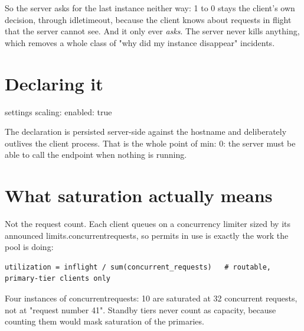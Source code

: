 \documentclass[11pt,a4paper,oneside]{book}
\newcommand{\aperiobreakableunderscore}{\textunderscore\allowbreak}
\newcommand{\aperiocodebreaks}{\XeTeXinterchartokenstate=1 }
\newcommand{\aperiocodebreaks}{}
\DeclareRobustCommand{\code}[1]{{\ttfamily\small\aperiocodebreaks
  \let\_\aperiobreakableunderscore#1}}
\begin{document}
So the server asks for the last instance neither way: 1 to 0 stays the
client's own decision, through \code{idle\_timeout}, because the client
knows about requests in flight that the server cannot see. And it only
ever \emph{asks}. The server never kills anything, which removes a whole
class of "why did my instance disappear" incidents.

\section{Declaring it}

\begin{codecard}[aperioyaml]{settings}
scaling:
  enabled: true
\end{codecard}


The declaration is persisted server-side against the hostname and
deliberately outlives the client process. That is the whole point of
\code{min: 0}: the server must be able to call the endpoint when nothing
is running.

\section{What saturation actually means}

Not the request count. Each client queues on a concurrency limiter sized
by its announced \code{limits.concurrent\_requests}, so permits in use is
exactly the work the pool is doing:

\begin{lstlisting}[language=aperiosh]
utilization = inflight / sum(concurrent_requests)   # routable, primary-tier clients only
\end{lstlisting}

Four instances of \code{concurrent\_requests: 10} are saturated at 32
concurrent requests, not at "request number 41". Standby tiers never
count as capacity, because counting them would mask saturation of the
primaries.
\end{document}

